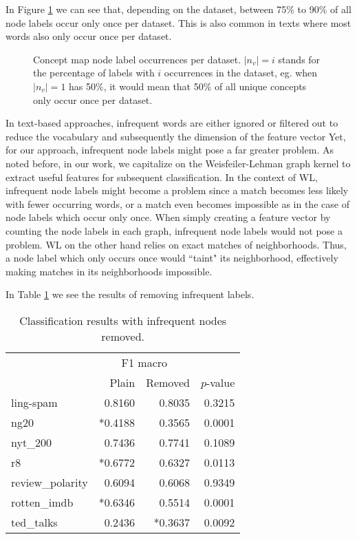 In Figure \ref{fig:percentage_distribution_concept_occurrences} we can see that, depending on the dataset, between 75\% to 90\% of all node labels occur only once per dataset.
This is also common in texts where most words also only occur once per dataset.
 
\begin{figure}[htb!]
    \caption[Statistics: Distribution concept occurrence]{Concept map node label occurrences per dataset. $|n_v| = i$ stands for the percentage of labels with $i$ occurrences in the dataset, eg. when $|n_v| = 1$ has 50\%, it would mean that 50\% of all unique concepts only occur once per dataset.}\label{fig:percentage_distribution_concept_occurrences}
\end{figure}

In text-based approaches, infrequent words are either ignored or filtered out to reduce the vocabulary and subsequently the dimension of the feature vector
Yet, for our approach, infrequent node labels might pose a far greater problem.
As noted before, in our work, we capitalize on the Weisfeiler-Lehman graph kernel to extract useful features for subsequent classification.
In the context of WL, infrequent node labels might become a problem since a match becomes less likely with fewer occurring words, or a match even becomes impossible as in the case of node labels which occur only once.
When simply creating a feature vector by counting the node labels in each graph, infrequent node labels would not pose a problem.
WL on the other hand relies on exact matches of neighborhoods.
Thus, a node label which only occurs once would ``taint" its neighborhood, effectively making matches in its neighborhoods impossible.

In Table \ref{table:results_infrequent_nodes} we see the results of removing infrequent labels.

\begin{table}[htb!]
    \centering
    \begin{tabular}{lrrr}
\toprule
        &  \multicolumn{2}{c}{F1 macro} &  \\
         &  Plain &  Removed &  $p$-value \\
        \midrule
           ling-spam       & 0.8160 & 0.8035 & 0.3215 \\
           ng20            & *0.4188 & 0.3565 & 0.0001 \\
           nyt\_200         & 0.7436 & 0.7741 & 0.1089 \\
           r8              & *0.6772 & 0.6327 & 0.0113 \\
           review\_polarity & 0.6094 & 0.6068 & 0.9349 \\
           rotten\_imdb     & *0.6346 & 0.5514 & 0.0001 \\
           ted\_talks       & 0.2436 & *0.3637 & 0.0092 \\
        \bottomrule
    \end{tabular}
    \caption[Results: Remove infrequent node labels]{Classification results with infrequent nodes removed.}\label{table:results_infrequent_nodes}
\end{table}

